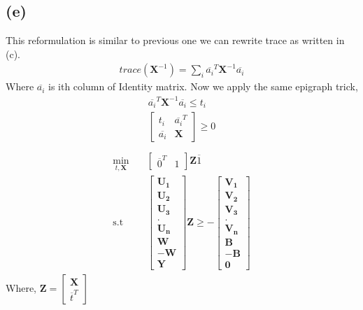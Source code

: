 \documentclass{article}
\begin{document}
\subsection*{(e)}
This reformulation is similar to previous one we can rewrite trace as written in (c).
\begin{gather*}
	trace(\mathbf{X}^{-1}) = \sum_{i}\overline{a_i}^T{\mathbf{X}^{-1}}\overline{a_i}
\end{gather*}
Where $\overline{a_i}$ is ith column of Identity matrix. Now we apply the same epigraph trick,
\begin{gather*}
	\overline{a_i}^T{\mathbf{X}^{-1}}\overline{a_i} \le t_i\\
	\begin{bmatrix}
		t_i & \overline{a_i}^T\\
		\overline{a_i} & \mathbf{X}
		\end{bmatrix} \ge 0\\
\end{gather*}
\begin{gather*}
	\begin{aligned}
		\min _{t, \mathbf{X}} \quad & \begin{bmatrix}
		\overline{0}^T & 1
		\end{bmatrix}\mathbf{Z}\overline{1}\\
		\textrm{s.t} \quad & \begin{bmatrix}
		\mathbf{U_1}\\
		\mathbf{U_2}\\
		\mathbf{U_3}\\
		.\\
		\mathbf{U_n}\\
		\mathbf{W}\\
		-\mathbf{W}\\
		\mathbf{Y}
		\end{bmatrix}\mathbf{Z} \ge -\begin{bmatrix}
		\mathbf{V_1}\\
		\mathbf{V_2}\\
		\mathbf{V_3}\\
		.\\
		\mathbf{V_n}\\
		\mathbf{B}\\
		-\mathbf{B}\\
		\mathbf{0}
		\end{bmatrix}
	\end{aligned}
\end{gather*}
Where, $\mathbf{Z} = \begin{bmatrix}
\mathbf{X}\\
\overline{t}^T
\end{bmatrix}$
\end{document}
